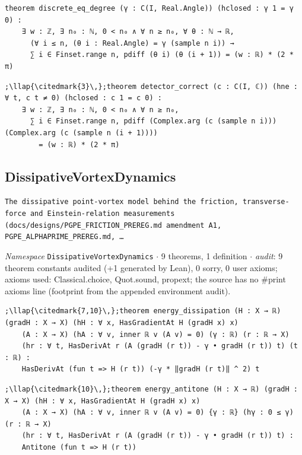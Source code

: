 \begin{lstlisting}[style=leancat]
theorem discrete_eq_degree (γ : C(I, Real.Angle)) (hclosed : γ 1 = γ 0) :
    ∃ w : ℤ, ∃ n₀ : ℕ, 0 < n₀ ∧ ∀ n ≥ n₀, ∀ θ : ℕ → ℝ,
      (∀ i ≤ n, (θ i : Real.Angle) = γ (sample n i)) →
      ∑ i ∈ Finset.range n, pdiff (θ i) (θ (i + 1)) = (w : ℝ) * (2 * π)
\end{lstlisting}

\begin{lstlisting}[style=leancat]
;\llap{\citedmark{3}\,};theorem detector_correct (c : C(I, ℂ)) (hne : ∀ t, c t ≠ 0) (hclosed : c 1 = c 0) :
    ∃ w : ℤ, ∃ n₀ : ℕ, 0 < n₀ ∧ ∀ n ≥ n₀,
      ∑ i ∈ Finset.range n, pdiff (Complex.arg (c (sample n i))) (Complex.arg (c (sample n (i + 1))))
        = (w : ℝ) * (2 * π)
\end{lstlisting}

\subsection{DissipativeVortexDynamics}\label{appA:DissipativeVortexDynamics}
{\footnotesize\raggedright\texttt{The dissipative point-\allowbreak{}vortex model behind the friction,\allowbreak{} transverse-\allowbreak{}force and Einstein-\allowbreak{}relation measurements (docs/\allowbreak{}designs/\allowbreak{}PGPE\_\allowbreak{}FRICTION\_\allowbreak{}PREREG.\allowbreak{}md amendment A1,\allowbreak{} PGPE\_\allowbreak{}ALPHAPRIME\_\allowbreak{}PREREG.\allowbreak{}md,\allowbreak{} …}\par}
{\footnotesize\raggedright\emph{Namespace} \texttt{DissipativeVortexDynamics} $\cdot$ 9 theorems, 1 definition $\cdot$ \emph{audit}: 9 theorem constants audited (+1 generated by Lean), 0 sorry, 0 user axioms; axioms used: Classical.choice, Quot.sound, propext; the source has no \#print axioms line (footprint from the appended environment audit).\par}
\vspace{1pt}
\begin{lstlisting}[style=leancat]
;\llap{\citedmark{7,10}\,};theorem energy_dissipation (H : X → ℝ) (gradH : X → X) (hH : ∀ x, HasGradientAt H (gradH x) x)
    (A : X → X) (hA : ∀ v, inner ℝ v (A v) = 0) (γ : ℝ) (r : ℝ → X)
    (hr : ∀ t, HasDerivAt r (A (gradH (r t)) - γ • gradH (r t)) t) (t : ℝ) :
    HasDerivAt (fun t => H (r t)) (-γ * ‖gradH (r t)‖ ^ 2) t
\end{lstlisting}

\begin{lstlisting}[style=leancat]
;\llap{\citedmark{10}\,};theorem energy_antitone (H : X → ℝ) (gradH : X → X) (hH : ∀ x, HasGradientAt H (gradH x) x)
    (A : X → X) (hA : ∀ v, inner ℝ v (A v) = 0) {γ : ℝ} (hγ : 0 ≤ γ) (r : ℝ → X)
    (hr : ∀ t, HasDerivAt r (A (gradH (r t)) - γ • gradH (r t)) t) :
    Antitone (fun t => H (r t))
\end{lstlisting}


